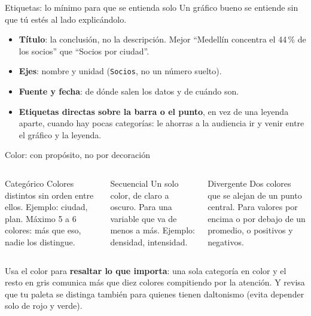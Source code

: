 \documentclass[aspectratio=169,11pt]{beamer}
\begin{document}
\begin{frame}{Etiquetas: lo mínimo para que se entienda solo}
  \small
  Un gráfico bueno se entiende sin que tú estés al lado explicándolo.
  \begin{itemize}
    \small
    \item \textbf{Título}: la conclusión, no la descripción. Mejor
      ``Medellín concentra el 44\,\% de los socios'' que ``Socios por
      ciudad''.
    \item \textbf{Ejes}: nombre y unidad (\texttt{Socios}, no un número
      suelto).
    \item \textbf{Fuente y fecha}: de dónde salen los datos y de cuándo son.
    \item \textbf{Etiquetas directas sobre la barra o el punto}, en vez de
      una leyenda aparte, cuando hay pocas categorías: le ahorras a la
      audiencia ir y venir entre el gráfico y la leyenda.
  \end{itemize}
\end{frame}

\begin{frame}{Color: con propósito, no por decoración}
  \small
  \begin{columns}[T,onlytextwidth]
    \begin{exampleblock}{Categórico}
      \small Colores distintos sin orden entre ellos. Ejemplo: ciudad,
      plan. Máximo 5 a 6 colores: más que eso, nadie los distingue.
    \end{exampleblock}
    \begin{exampleblock}{Secuencial}
      \small Un solo color, de claro a oscuro. Para una variable que va de
      menos a más. Ejemplo: densidad, intensidad.
    \end{exampleblock}
    \begin{exampleblock}{Divergente}
      \small Dos colores que se alejan de un punto central. Para valores
      por encima o por debajo de un promedio, o positivos y negativos.
    \end{exampleblock}
  \end{columns}
  \vspace{0.2cm}
  \small Usa el color para \textbf{resaltar lo que importa}: una sola
  categoría en color y el resto en gris comunica más que diez colores
  compitiendo por la atención. Y revisa que tu paleta se distinga también
  para quienes tienen daltonismo (evita depender solo de rojo y verde).
\end{frame}
\end{document}
